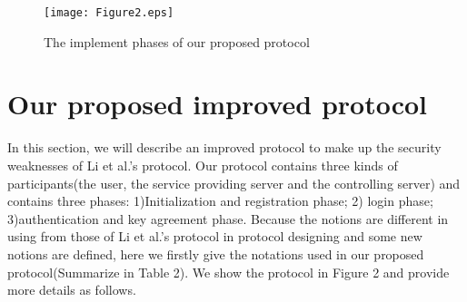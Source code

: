 \documentclass[preprint,12pt]{elsarticle}
\begin{document}
\begin{figure}[!htb]
\begin{center}
\texttt{[image: Figure2.eps]}
\caption{The implement phases of our proposed protocol}
\end{center}
\end{figure}

\section{Our proposed improved protocol}
In this section, we will describe an improved protocol to make up the security weaknesses of Li et al.'s protocol. Our protocol contains three kinds of participants(the user, the service providing server and the controlling server) and contains three phases: 1)Initialization and registration phase; 2) login phase; 3)authentication and key agreement phase. Because the notions are different in using from those of Li et al.'s protocol in protocol designing and some new notions are defined, here we firstly give the notations used in our proposed protocol(Summarize in Table 2). We show the protocol in Figure 2 and provide more details as follows.

\begin{table}[!ht]
\centering
\caption{Notations used in our proposed protocol}
\end{table}
\end{document}
